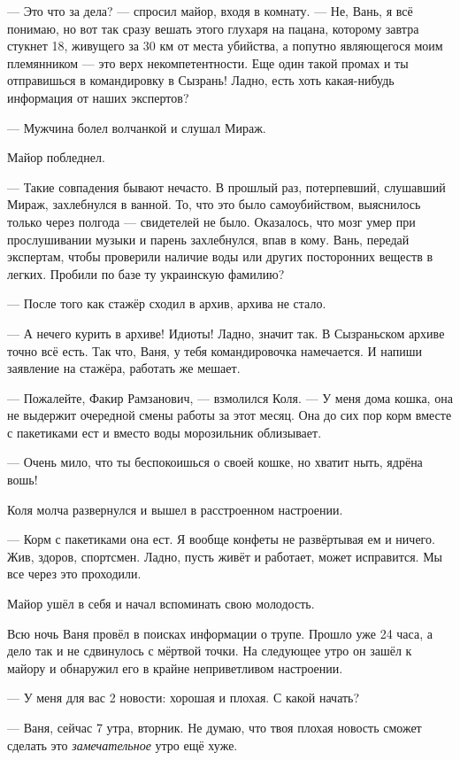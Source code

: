 --- Это что за дела? --- спросил майор, входя в комнату. --- Не, Вань, я всё понимаю, но вот так сразу вешать этого глухаря на пацана, которому завтра стукнет 18, живущего за 30 км от места убийства, а попутно являющегося моим племянником --- это верх некомпетентности. Еще один такой промах и ты отправишься в командировку в Сызрань! Ладно, есть хоть какая-нибудь информация от наших экспертов?

--- Мужчина болел волчанкой и слушал Мираж.

Майор побледнел.

--- Такие совпадения бывают нечасто. В прошлый раз, потерпевший, слушавший Мираж, захлебнулся в ванной. То, что это было самоубийством, выяснилось только через полгода --- свидетелей не было. Оказалось, что мозг умер при прослушивании музыки и парень захлебнулся, впав в кому. Вань, передай экспертам, чтобы проверили наличие воды или других посторонних веществ в легких. Пробили по базе ту украинскую фамилию?

--- После того как стажёр сходил в архив, архива не стало.

--- А нечего курить в архиве! Идиоты! Ладно, значит так. В Сызраньском архиве точно всё есть. Так что, Ваня, у тебя командировочка намечается. И напиши заявление на стажёра, работать же мешает.

--- Пожалейте, Факир Рамзанович, --- взмолился Коля. --- У меня дома кошка, она не выдержит очередной смены работы за этот месяц. Она до сих пор корм вместе с пакетиками ест и вместо воды морозильник облизывает.

--- Очень мило, что ты беспокоишься о своей кошке, но хватит ныть, ядрёна вошь!

Коля молча развернулся и вышел в расстроенном настроении.

--- Корм с пакетиками она ест. Я вообще конфеты не развёртывая ем и ничего. Жив, здоров, спортсмен. Ладно, пусть живёт и работает, может исправится. Мы все через это проходили.

Майор ушёл в себя и начал вспоминать свою молодость.

\asterisks

Всю ночь Ваня провёл в поисках информации о трупе. Прошло уже 24 часа, а дело так и не сдвинулось с мёртвой точки. На следующее утро он зашёл к майору и обнаружил его в крайне неприветливом настроении.

--- У меня для вас 2 новости: хорошая и плохая. С какой начать?

--- Ваня, сейчас 7 утра, вторник. Не думаю, что твоя плохая новость сможет сделать это \emph{замечательное} утро ещё хуже.

